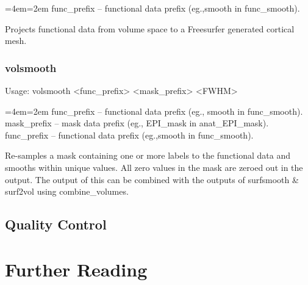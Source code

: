 \documentclass[final,titlepage,letterpaper,oneside,12pt]{article}
\renewcommand{\texttt}[2][BrickRed]{\textcolor{#1}{\ttfamily #2}}%
\newenvironment{blockquote}{%
  \par%
  \medskip
  \leftskip=4em\rightskip=2em%
  \noindent\ignorespaces}{%
  \par\medskip}
\begin{document}
\begin{blockquote}
func\_prefix -- functional data prefix (eg.,smooth in func\_smooth).
\end{blockquote}

\noindent Projects functional data from volume space to a Freesurfer generated cortical mesh.

\subsubsection{volsmooth}
Usage: \texttt{volsmooth <func\_prefix> <mask\_prefix> <FWHM>}

\begin{blockquote}
func\_prefix -- functional data prefix (eg., smooth in func\_smooth).
mask\_prefix -- mask data prefix (eg., EPI\_mask in anat\_EPI\_mask).
func\_prefix -- functional data prefix (eg.,smooth in func\_smooth).
\end{blockquote}

\noindent Re-samples a mask containing one or more labels to the functional data and smooths within unique values. All zero values in the mask are zeroed out in the output. The output of this can be combined with the outputs of \texttt{surfsmooth} \& \texttt{surf2vol} using \texttt{combine\_volumes}.

\subsection{Quality Control}

\section{Further Reading}

\newpage 


\end{document}
